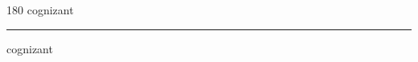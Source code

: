 
\begin{frame}
\begin{center}
\begin{turn}{180}
{\fontsize{2.5cm}{1em}\selectfont cognizant}
\end{turn}
\vspace{1em}\par  
\hrule
\vspace{1em}\par  
{\fontsize{2.5cm}{1em}\selectfont cognizant}
\end{center}
\end{frame}
